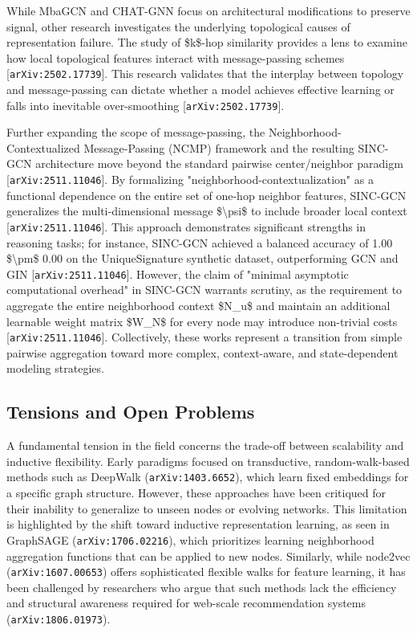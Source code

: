 \documentclass[11pt]{article}
\begin{document}
While MbaGCN and CHAT-GNN focus on architectural modifications to preserve signal, other research investigates the underlying topological causes of representation failure. The study of \$k\$-hop similarity provides a lens to examine how local topological features interact with message-passing schemes [\texttt{arXiv:2502.17739}]. This research validates that the interplay between topology and message-passing can dictate whether a model achieves effective learning or falls into inevitable over-smoothing [\texttt{arXiv:2502.17739}].

Further expanding the scope of message-passing, the Neighborhood-Contextualized Message-Passing (NCMP) framework and the resulting SINC-GCN architecture move beyond the standard pairwise center/neighbor paradigm [\texttt{arXiv:2511.11046}]. By formalizing "neighborhood-contextualization" as a functional dependence on the entire set of one-hop neighbor features, SINC-GCN generalizes the multi-dimensional message \$\textbackslash{}psi\$ to include broader local context [\texttt{arXiv:2511.11046}]. This approach demonstrates significant strengths in reasoning tasks; for instance, SINC-GCN achieved a balanced accuracy of 1.00 \$\textbackslash{}pm\$ 0.00 on the UniqueSignature synthetic dataset, outperforming GCN and GIN [\texttt{arXiv:2511.11046}]. However, the claim of "minimal asymptotic computational overhead" in SINC-GCN warrants scrutiny, as the requirement to aggregate the entire neighborhood context \$N\_u\$ and maintain an additional learnable weight matrix \$W\_N\$ for every node may introduce non-trivial costs [\texttt{arXiv:2511.11046}]. Collectively, these works represent a transition from simple pairwise aggregation toward more complex, context-aware, and state-dependent modeling strategies.

\subsection{Tensions and Open Problems}

A fundamental tension in the field concerns the trade-off between scalability and inductive flexibility. Early paradigms focused on transductive, random-walk-based methods such as DeepWalk (\texttt{arXiv:1403.6652}), which learn fixed embeddings for a specific graph structure. However, these approaches have been critiqued for their inability to generalize to unseen nodes or evolving networks. This limitation is highlighted by the shift toward inductive representation learning, as seen in GraphSAGE (\texttt{arXiv:1706.02216}), which prioritizes learning neighborhood aggregation functions that can be applied to new nodes. Similarly, while node2vec (\texttt{arXiv:1607.00653}) offers sophisticated flexible walks for feature learning, it has been challenged by researchers who argue that such methods lack the efficiency and structural awareness required for web-scale recommendation systems (\texttt{arXiv:1806.01973}).
\end{document}
